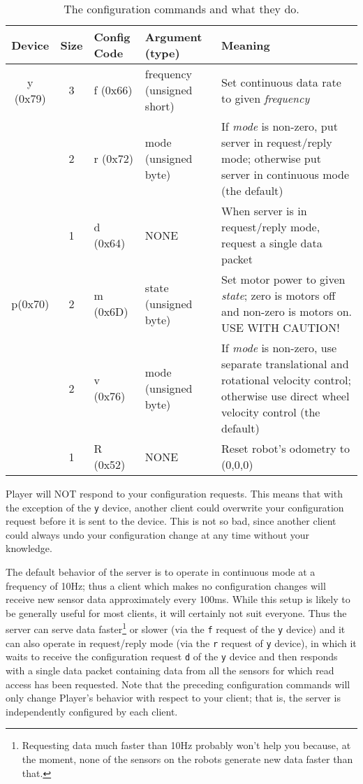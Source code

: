 \documentclass[11pt]{article}
\begin{document}
\begin{table}
\begin{center}
\begin{tabularx}{\columnwidth}{|c|c|l|l|X|}
\hline
Device & Size & Config Code & Argument (type) & Meaning \\
\hline
y (0x79) & 3 & f (0x66) & frequency (unsigned short) & 
Set continuous data rate to given {\sl frequency} \\
& 2 & r (0x72) & mode (unsigned byte) & 
If {\sl mode} is non-zero, put server
in request/reply mode; otherwise put server in continuous mode (the default) \\
& 1 & d (0x64) & NONE & 
When server is in request/reply mode, request a single data packet \\
\hline
p(0x70) & 2 & m (0x6D) & state (unsigned byte) & 
Set motor power to given {\sl state}; zero is motors off and non-zero is motors on.  USE WITH CAUTION! \\
& 2 & v (0x76) & mode (unsigned byte) & 
If {\sl mode} is non-zero, use separate translational and rotational 
velocity control; otherwise use direct wheel velocity control (the default) \\
& 1 & R (0x52) & NONE & Reset robot's odometry to (0,0,0)\\
\hline
\end{tabularx}
\end{center}
\caption{The configuration commands and what they do.}
\label{configurefig}
\end{table}

Player will NOT respond to your configuration requests.   This means that
with the exception of the {\tt y} device,
another client could overwrite your configuration request before it is
sent to the device.  This is not so bad, since another client could always
undo your configuration change at any time without your knowledge.

The default behavior of the server is to operate in continuous mode at a
frequency of 10Hz; thus a client which makes no configuration changes will 
receive new sensor data approximately every 100ms.  While this setup is
likely to be generally useful for most clients, it will certainly not suit
everyone.  Thus the server can serve data faster\footnote{Requesting data
much faster than 10Hz probably won't help you because, at the moment,  
none of the sensors on the robots generate new data faster than that.} 
or slower (via the {\tt f} request of the {\tt y} device) and it can
also operate in request/reply mode (via the {\tt r} request of {\tt y} device),
in which it waits to receive the 
configuration request {\tt d} of the {\tt y} device and then 
responds with a single data packet containing data from all the sensors 
for which read access has been requested.   Note that the preceding 
configuration commands
will only change Player's behavior with respect to your client; that is,
the server is independently configured by each client.
\end{document}
